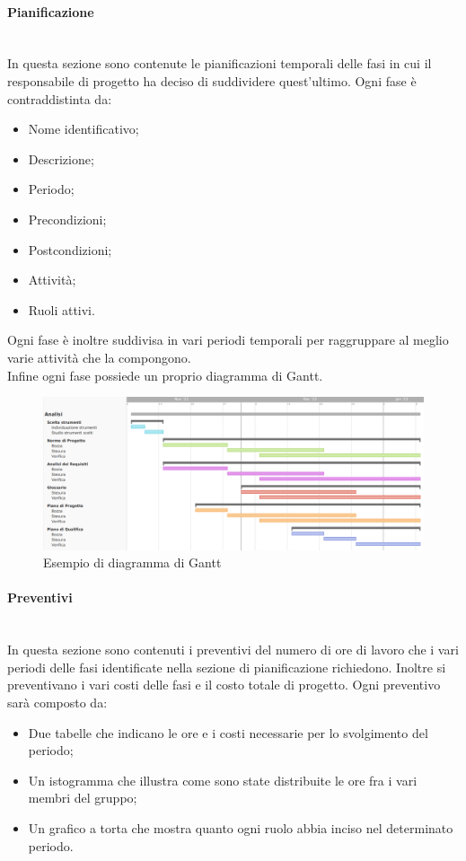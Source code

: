 \paragraph {Pianificazione}\mbox{}\\
In questa sezione sono contenute le pianificazioni temporali delle fasi in cui il responsabile di progetto ha deciso di suddividere quest'ultimo.
Ogni fase è contraddistinta da:
\begin{itemize}
	\item Nome identificativo;
	\item Descrizione;
	\item Periodo;
	\item Precondizioni;
	\item Postcondizioni;
	\item Attività;
	\item Ruoli attivi.
\end{itemize}
Ogni fase è inoltre suddivisa in vari periodi temporali per raggruppare al meglio varie attività che la compongono.\\
Infine ogni fase possiede un proprio diagramma di Gantt.
\begin{figure}[h!]
	\centering
	\includegraphics[width=15cm]{img/4_analisi.png}
	\caption{Esempio di diagramma di Gantt}
\end{figure}
\paragraph {Preventivi}\mbox{}\\
In questa sezione sono contenuti i preventivi del numero di ore di lavoro che i vari periodi delle fasi identificate nella sezione di pianificazione richiedono. Inoltre si preventivano i vari costi delle fasi e il costo totale di progetto.
Ogni preventivo sarà composto da:
\begin{itemize}
	\item Due tabelle che indicano le ore e i costi necessarie per lo svolgimento del periodo;
	\item Un istogramma che illustra come sono state distribuite le ore fra i vari membri del gruppo;
	\item Un grafico a torta che mostra quanto ogni ruolo abbia inciso nel determinato periodo.
\end{itemize}
